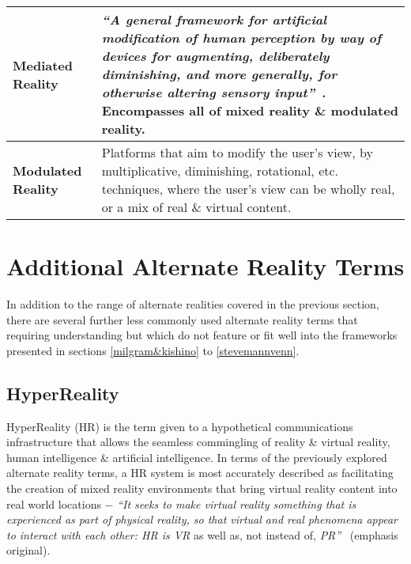 \begin{center}
\begin{longtable}{| l | p{12cm} |}
\textbf{Mediated Reality} & \textit{``A general framework for artificial modification of human perception by way of devices for augmenting, deliberately diminishing, and more generally, for otherwise altering sensory input''}~\cite{Mann2002a}. Encompasses all of mixed reality \& modulated reality. \\

\hline


\textbf{Modulated Reality} & Platforms that aim to modify the user's view, by multiplicative, diminishing, rotational, etc. techniques, where the user's view can be wholly real, or a mix of real \& virtual content. \\

\hline

\end{longtable}
\end{center}


\section{Additional Alternate Reality Terms}

In addition to the range of alternate realities covered in the previous section, there are several further less commonly used alternate reality terms that requiring understanding but which do not feature or fit well into the frameworks presented in sections \ref{milgram&kishino} to \ref{stevemannvenn}.


\subsection{HyperReality}

HyperReality (HR) is the term given to a hypothetical communications infrastructure that allows the seamless commingling of reality \& virtual reality, human intelligence \& artificial intelligence. In terms of the previously explored alternate reality terms, a HR system is most accurately described as facilitating the creation of mixed reality environments that bring virtual reality content into real world locations $-$ \textit{``It seeks to make virtual reality something that is experienced as part of physical reality, so that virtual and real phenomena appear to interact with each other: HR is VR} as well as, not instead of, \textit{PR''}~\cite{Terashima2001} (emphasis original).

